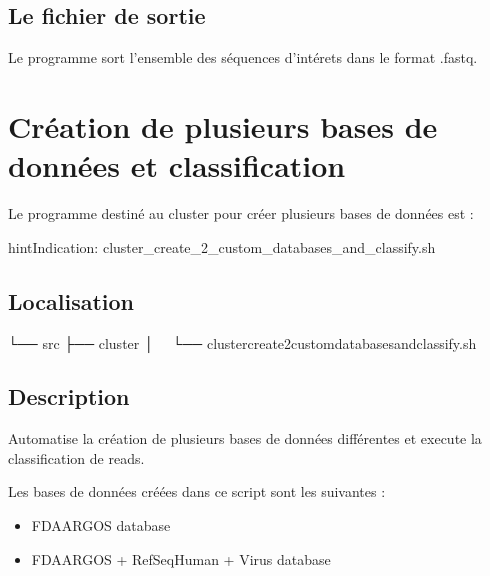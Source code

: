 \documentclass[letterpaper,10pt,french]{sphinxmanual}
\begin{document}
\subsection{Le fichier de sortie}
\label{\detokenize{cluster/cluster_create_16S_database.sh:le-fichier-de-sortie}}
Le programme sort l’ensemble des séquences d’intérets dans le format .fastq.


\section{Création de plusieurs bases de données et classification}
\label{\detokenize{cluster/cluster_create_2_custom_databases_and_classify.sh:creation-de-plusieurs-bases-de-donnees-et-classification}}\label{\detokenize{cluster/cluster_create_2_custom_databases_and_classify.sh::doc}}
Le programme destiné au cluster pour créer plusieurs bases de données est :

\begin{sphinxadmonition}{hint}{Indication:}
cluster\_create\_2\_custom\_databases\_and\_classify.sh
\end{sphinxadmonition}


\subsection{Localisation}
\label{\detokenize{cluster/cluster_create_2_custom_databases_and_classify.sh:localisation}}
\begin{sphinxVerbatim}[commandchars=\\\{\}]
└── src
 ├── cluster
 │   └── cluster\PYGZus{}create\PYGZus{}2\PYGZus{}custom\PYGZus{}databases\PYGZus{}and\PYGZus{}classify.sh
\end{sphinxVerbatim}


\subsection{Description}
\label{\detokenize{cluster/cluster_create_2_custom_databases_and_classify.sh:description}}
Automatise la création de plusieurs bases de données différentes et execute la classification de reads.

Les bases de données créées dans ce script sont les suivantes :
\begin{itemize}
\item {} 
FDA\sphinxhyphen{}ARGOS database

\item {} 
FDA\sphinxhyphen{}ARGOS + RefSeqHuman + Virus database

\end{itemize}
\end{document}
